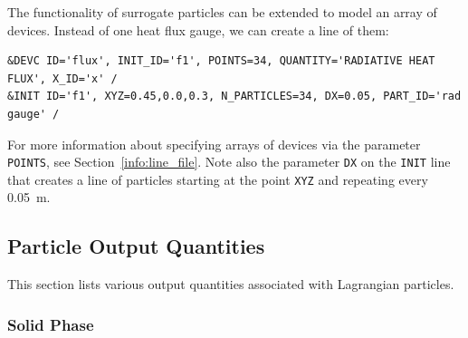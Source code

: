 \documentclass[11pt]{book}
\newcommand{\ct}{\tt\small}
\begin{document}
The functionality of surrogate particles can be extended to model an array of devices. Instead of one heat flux gauge, we can create a line of them:

\footnotesize
\begin{verbatim}
&DEVC ID='flux', INIT_ID='f1', POINTS=34, QUANTITY='RADIATIVE HEAT FLUX', X_ID='x' /
&INIT ID='f1', XYZ=0.45,0.0,0.3, N_PARTICLES=34, DX=0.05, PART_ID='rad gauge' /
\end{verbatim}
\normalsize

\noindent
For more information about specifying arrays of devices via the parameter {\ct POINTS}, see Section~\ref{info:line_file}. Note also the parameter {\ct DX} on the {\ct INIT} line that creates a line of particles starting at the point {\ct XYZ} and repeating every 0.05~m.










\subsection{Particle Output Quantities}
\label{info:part_output}

This section lists various output quantities associated with Lagrangian particles.

\subsubsection{Solid Phase}
\end{document}
